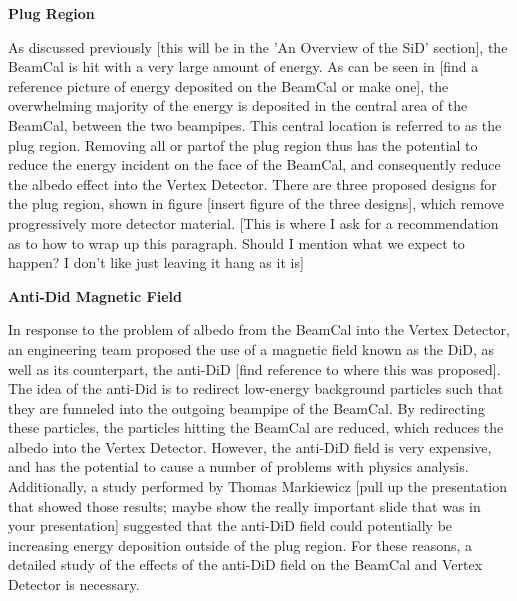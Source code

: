 \documentclass{article}
\begin{document}
        \begin{center}
            \bf{Plug Region}
        \end{center}

        As discussed previously [this will be in the 'An Overview of the SiD' section], the BeamCal is hit with a very large amount of energy. As can be seen in [find a reference picture of energy deposited on the BeamCal or make one], the overwhelming majority of the energy is deposited in the central area of the BeamCal, between the two beampipes. This central location is referred to as the plug region. Removing all or partof the plug region thus has the potential to reduce the energy incident on the face of the BeamCal, and consequently reduce the albedo effect into the Vertex Detector. There are three proposed designs for the plug region, shown in figure [insert figure of the three designs], which remove progressively more detector material. [This is where I ask for a recommendation as to how to wrap up this paragraph. Should I mention what we expect to happen? I don't like just leaving it hang as it is]


        \begin{center}
            \bf{Anti-Did Magnetic Field}
        \end{center}

        In response to the problem of albedo from the BeamCal into the Vertex Detector, an engineering team proposed the use of a magnetic field known as the DiD, as well as its counterpart, the anti-DiD [find reference to where this was proposed]. The idea of the anti-Did is to redirect low-energy background particles such that they are funneled into the outgoing beampipe of the BeamCal. By redirecting these particles, the particles hitting the BeamCal are reduced, which reduces the albedo into the Vertex Detector. However, the anti-DiD field is very expensive, and has the potential to cause a number of problems with physics analysis. Additionally, a study performed by Thomas Markiewicz [pull up the presentation that showed those results; maybe show the really important slide that was in your presentation] suggested that the anti-DiD field could potentially be increasing energy deposition outside of the plug region. For these reasons, a detailed study of the effects of the anti-DiD field on the BeamCal and Vertex Detector is necessary.
\end{document}
